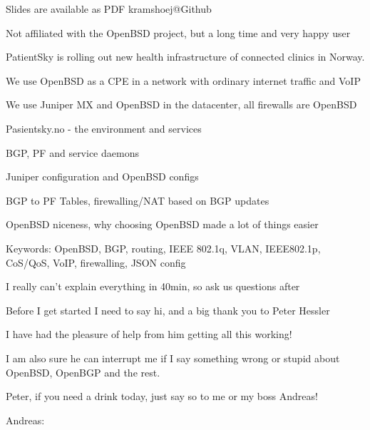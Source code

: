 \documentclass[18pt,landscape,a4paper,footrule]{foils}
\begin{document}


\vskip 1cm
\centerline{\footnotesize Slides are available as PDF kramshoej@Github}


\centerline{\footnotesize Not affiliated with the OpenBSD project, but a long time and very happy user}


PatientSky is rolling out new health infrastructure of connected clinics in Norway.

We use OpenBSD as a CPE in a network with ordinary internet traffic and VoIP

We use Juniper MX and OpenBSD in the datacenter, all firewalls are OpenBSD

\begin{list1}

\item Pasientsky.no - the environment and services
\item BGP, PF and service daemons
\item Juniper configuration and OpenBSD configs
\item BGP to PF Tables, firewalling/NAT based on BGP updates
\item OpenBSD niceness, why choosing OpenBSD made a lot of things easier
\item Keywords:
OpenBSD, BGP, routing, IEEE 802.1q, VLAN, IEEE802.1p, CoS/QoS, VoIP, firewalling, JSON config
\end{list1}

\centerline{I really can't explain everything in 40min, so ask us questions after}


Before I get started I need to say hi, and a big thank you to Peter Hessler

I have had the pleasure of help from him getting all this working!


I am also sure he can interrupt me if I say something wrong or stupid about OpenBSD, OpenBGP and the rest. \smiley

Peter, if you need a drink today, just say so to me or my boss Andreas!

\vskip 2cm
Andreas:




\end{document}
